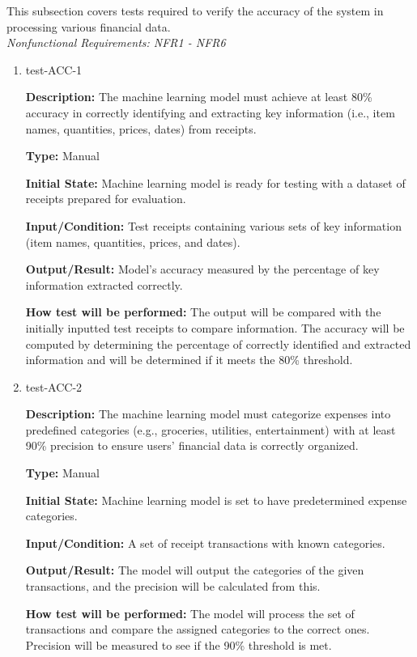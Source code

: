 \documentclass[12pt, titlepage]{article}
\begin{document}
This subsection covers tests required to verify the accuracy of the system in processing various financial data.\\
\textit{Nonfunctional Requirements: NFR1 - NFR6}

\begin{enumerate}

\item{test-ACC-1\\}

\textbf{Description:} The machine learning model must achieve at least 80\% accuracy in correctly identifying and extracting key information (i.e., item names, quantities, prices, dates) from receipts.

\textbf{Type:} Manual
					
\textbf{Initial State:} Machine learning model is ready for testing with a dataset of receipts prepared for evaluation.
					
\textbf{Input/Condition:} Test receipts containing various sets of key information (item names, quantities, prices, and dates).
					
\textbf{Output/Result:} Model’s accuracy measured by the percentage of key information extracted correctly.
					
\textbf{How test will be performed:} The output will be compared with the initially inputted test receipts to compare information. The accuracy will be computed by determining the percentage of correctly identified and extracted information and will be determined if it meets the 80\% threshold.

\item{test-ACC-2\\}

\textbf{Description:} The machine learning model must categorize expenses into predefined categories (e.g., groceries, utilities, entertainment) with at least 90\% precision to ensure users’ financial data is correctly organized.

\textbf{Type:} Manual
					
\textbf{Initial State:} Machine learning model is set to have predetermined expense categories.
					
\textbf{Input/Condition:} A set of receipt transactions with known categories.
					
\textbf{Output/Result:} The model will output the categories of the given transactions, and the precision will be calculated from this.
					
\textbf{How test will be performed:} The model will process the set of transactions and compare the assigned categories to the correct ones. Precision will be measured to see if the 90\% threshold is met.


\end{enumerate}
\end{document}
